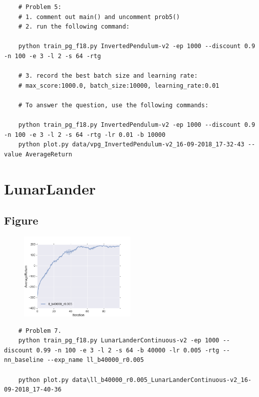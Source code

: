 \documentclass[12pt]{article}
\newcounter{question}
\begin{document}
	\begin{minipage}{\linewidth}
	\begin{lstlisting}
	# Problem 5: 
	# 1. comment out main() and uncomment prob5()
	# 2. run the following command:
	
	python train_pg_f18.py InvertedPendulum-v2 -ep 1000 --discount 0.9 -n 100 -e 3 -l 2 -s 64 -rtg
	
	# 3. record the best batch size and learning rate:
	# max_score:1000.0, batch_size:10000, learning_rate:0.01
	
	# To answer the question, use the following commands:
	
	python train_pg_f18.py InvertedPendulum-v2 -ep 1000 --discount 0.9 -n 100 -e 3 -l 2 -s 64 -rtg -lr 0.01 -b 10000
	python plot.py data/vpg_InvertedPendulum-v2_16-09-2018_17-32-43 --value AverageReturn
	\end{lstlisting}
	\end{minipage}
	
	
	\section{LunarLander}
	\subsection{Figure}
	\begin{figure}[!htbp]
		\includegraphics[width=0.5\textwidth]{problem7.png}
	\end{figure}
	\begin{minipage}{\linewidth}
	\begin{lstlisting}
	# Problem 7.
	python train_pg_f18.py LunarLanderContinuous-v2 -ep 1000 --discount 0.99 -n 100 -e 3 -l 2 -s 64 -b 40000 -lr 0.005 -rtg --nn_baseline --exp_name ll_b40000_r0.005
	
	python plot.py data\ll_b40000_r0.005_LunarLanderContinuous-v2_16-09-2018_17-40-36
	\end{lstlisting}
	\end{minipage}
	
\end{document}
